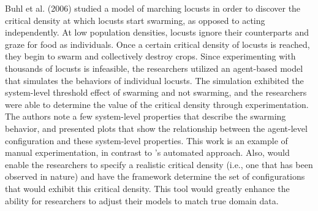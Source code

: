 Buhl et al. (2006)\nocite{buhl2006dom} studied a model of marching locusts in order to discover the critical density at which locusts start swarming, as opposed to acting independently.
At low population densities, locusts ignore their counterparts and graze for food as individuals.
Once a certain critical density of locusts is reached, they begin to swarm and collectively destroy crops.
Since experimenting with thousands of locusts is infeasible, the researchers utilized an agent-based model that simulates the behaviors of individual locusts.
The simulation exhibited the system-level threshold effect of swarming and not swarming, and the researchers were able to determine the value of the critical density through experimentation.
The authors note a few system-level properties that describe the swarming behavior, and presented plots that show the relationship between the agent-level configuration and these system-level properties.
This work is an example of manual experimentation, in contrast to \fw's automated approach.
Also, \fw would enable the researchers to specify a realistic critical density (i.e., one that has been observed in nature) and have the framework determine the set of configurations that would exhibit this critical density.
This tool would greatly enhance the ability for researchers to adjust their models to match true domain data.

